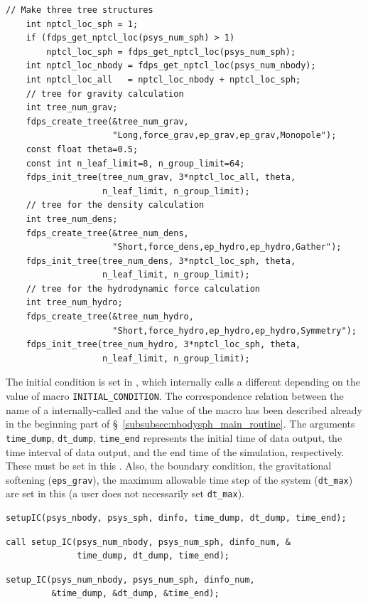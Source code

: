 \begin{lstlisting}[caption=Creation and initialization of \textsf{TreeForForce} objects]
    // Make three tree structures
    int nptcl_loc_sph = 1;
    if (fdps_get_nptcl_loc(psys_num_sph) > 1)
        nptcl_loc_sph = fdps_get_nptcl_loc(psys_num_sph);
    int nptcl_loc_nbody = fdps_get_nptcl_loc(psys_num_nbody);
    int nptcl_loc_all   = nptcl_loc_nbody + nptcl_loc_sph;
    // tree for gravity calculation
    int tree_num_grav;
    fdps_create_tree(&tree_num_grav,
                     "Long,force_grav,ep_grav,ep_grav,Monopole");
    const float theta=0.5;
    const int n_leaf_limit=8, n_group_limit=64;
    fdps_init_tree(tree_num_grav, 3*nptcl_loc_all, theta,
                   n_leaf_limit, n_group_limit);
    // tree for the density calculation
    int tree_num_dens;
    fdps_create_tree(&tree_num_dens,
                     "Short,force_dens,ep_hydro,ep_hydro,Gather");
    fdps_init_tree(tree_num_dens, 3*nptcl_loc_sph, theta,
                   n_leaf_limit, n_group_limit);
    // tree for the hydrodynamic force calculation
    int tree_num_hydro;
    fdps_create_tree(&tree_num_hydro,
                     "Short,force_hydro,ep_hydro,ep_hydro,Symmetry");
    fdps_init_tree(tree_num_hydro, 3*nptcl_loc_sph, theta,
                   n_leaf_limit, n_group_limit);
\end{lstlisting}
\endifC



The initial condition is set in \procedure {}, which internally calls a different \procedure depending on the value of macro \texttt{INITIAL\_CONDITION}. The correspondence relation between the name of a internally-called \procedure and the value of the macro has been described already in the beginning part of \S~\ref{subsubsec:nbodysph_main_routine}. The arguments \texttt{time\_dump}, \texttt{dt\_dump}, \texttt{time\_end} represents the initial time of data output, the time interval of data output, and the end time of the simulation, respectively. These must be set in this \procedure. Also, the boundary condition, the gravitational softening (\texttt{eps\_grav}), the maximum allowable time step of the system (\texttt{dt\_max}) are set in this \procedure (a user does not necessarily set \texttt{dt\_max}).

\ifCpp %
\begin{lstlisting}[caption=Setting initial condition]
setupIC(psys_nbody, psys_sph, dinfo, time_dump, dt_dump, time_end);
\end{lstlisting}
\endifCpp
\ifFtn %
\begin{lstlisting}[caption=Setting initial condition]
call setup_IC(psys_num_nbody, psys_num_sph, dinfo_num, &
              time_dump, dt_dump, time_end);
\end{lstlisting}
\endifFtn
\ifC %
\begin{lstlisting}[caption=Setting initial condition]
setup_IC(psys_num_nbody, psys_num_sph, dinfo_num,
         &time_dump, &dt_dump, &time_end);
\end{lstlisting}
\endifC


